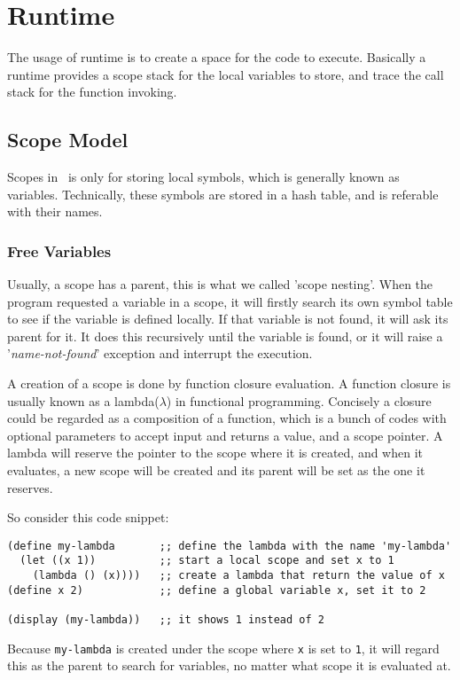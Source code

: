 \section{Runtime}
The usage of runtime is to create a space for the code to
execute. Basically a runtime provides a scope stack for the local
variables to store, and trace the call stack for the function
invoking.

\subsection{Scope Model}
Scopes in \revo\ is only for storing local symbols, which is generally
known as variables. Technically, these symbols are stored in a hash
table, and is referable with their names.

\subsubsection{Free Variables}
Usually, a scope has a parent, this is what we called 'scope nesting'.
When the program requested a variable in a scope, it will firstly
search its own symbol table to see if the variable is defined
locally. If that variable is not found, it will ask its parent for
it. It does this recursively until the variable is found, or it will
raise a '\emph{name-not-found}' exception and interrupt the execution.

A creation of a scope is done by function closure evaluation. A
function closure is usually known as a lambda($\lambda$) in functional
programming. Concisely a closure could be regarded as a composition of
a function, which is a bunch of codes with optional parameters to
accept input and returns a value, and a scope pointer. A lambda will
reserve the pointer to the scope where it is created, and when it
evaluates, a new scope will be created and its parent will be set as
the one it reserves.

So consider this code snippet:
\begin{verbatim}
(define my-lambda       ;; define the lambda with the name 'my-lambda'
  (let ((x 1))          ;; start a local scope and set x to 1
    (lambda () (x))))   ;; create a lambda that return the value of x
(define x 2)            ;; define a global variable x, set it to 2

(display (my-lambda))   ;; it shows 1 instead of 2
\end{verbatim}

Because \verb+my-lambda+ is created under the scope where \verb+x+ is
set to \verb+1+, it will regard this as the parent to search for
variables, no matter what scope it is evaluated at.

